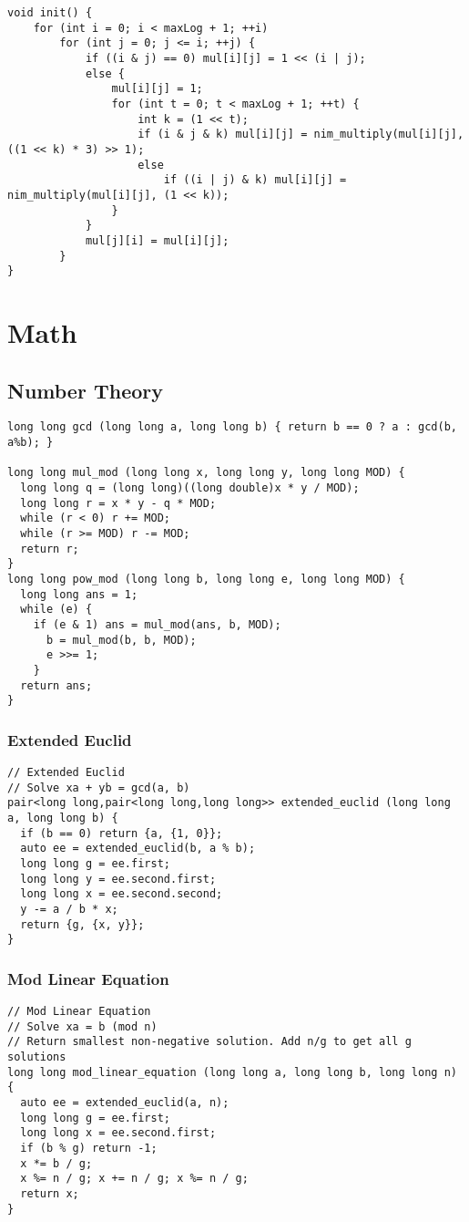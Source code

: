 \documentclass[10pt,landscape]{article}
\begin{document}
\begin{multicols}{2}
\begin{lstlisting}
void init() {
    for (int i = 0; i < maxLog + 1; ++i)
        for (int j = 0; j <= i; ++j) {
            if ((i & j) == 0) mul[i][j] = 1 << (i | j);
            else {
                mul[i][j] = 1;
                for (int t = 0; t < maxLog + 1; ++t) {
                    int k = (1 << t);
                    if (i & j & k) mul[i][j] = nim_multiply(mul[i][j], ((1 << k) * 3) >> 1);
                    else
                        if ((i | j) & k) mul[i][j] = nim_multiply(mul[i][j], (1 << k));
                }
            }
            mul[j][i] = mul[i][j];
        }
}
\end{lstlisting}
\section{Math}
\subsection{Number Theory}
\begin{lstlisting}
long long gcd (long long a, long long b) { return b == 0 ? a : gcd(b, a%b); }

long long mul_mod (long long x, long long y, long long MOD) {
  long long q = (long long)((long double)x * y / MOD);
  long long r = x * y - q * MOD;
  while (r < 0) r += MOD;
  while (r >= MOD) r -= MOD;
  return r;
}
long long pow_mod (long long b, long long e, long long MOD) {
  long long ans = 1;
  while (e) {
    if (e & 1) ans = mul_mod(ans, b, MOD);
      b = mul_mod(b, b, MOD);
      e >>= 1;
    }
  return ans;
}
\end{lstlisting}
\subsubsection{Extended Euclid}
\begin{lstlisting}
// Extended Euclid
// Solve xa + yb = gcd(a, b)
pair<long long,pair<long long,long long>> extended_euclid (long long a, long long b) {
  if (b == 0) return {a, {1, 0}};
  auto ee = extended_euclid(b, a % b);
  long long g = ee.first;
  long long y = ee.second.first;
  long long x = ee.second.second;
  y -= a / b * x;
  return {g, {x, y}};
}
\end{lstlisting}
\subsubsection{Mod Linear Equation}
\begin{lstlisting}
// Mod Linear Equation
// Solve xa = b (mod n)
// Return smallest non-negative solution. Add n/g to get all g solutions
long long mod_linear_equation (long long a, long long b, long long n) {
  auto ee = extended_euclid(a, n);
  long long g = ee.first;
  long long x = ee.second.first;
  if (b % g) return -1;
  x *= b / g;
  x %= n / g; x += n / g; x %= n / g;
  return x;
}
\end{lstlisting}

\end{multicols}
\end{document}
